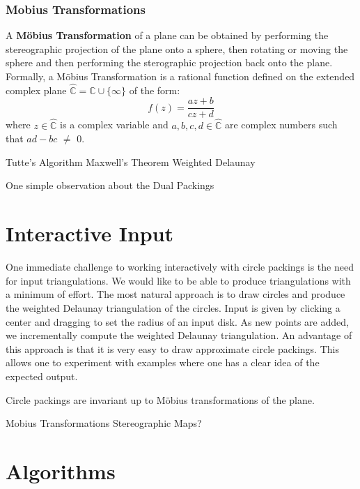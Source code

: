 \documentclass[a4paper,UKenglish]{lipics}
\newcommand{\C}{\mathbb{C}}
\newcommand{\CP}{\hat{\mathbb{C}}}
\begin{document}
  \subsubsection{Mobius Transformations}
  A \textbf{M\"{o}bius Transformation} of a plane can be obtained by performing the stereographic projection of the plane onto a sphere, then rotating or moving the sphere and then performing the sterographic projection back onto the plane. 
  Formally, a M\"{o}bius Transformation is a rational function defined on the extended complex plane $\CP = \C\cup\{\infty\}$ of the form:
  \begin{equation} 
  	f(z) = \frac{az+b}{cz+d}
  \end{equation}
  where $z\in\CP$ is a complex variable and $a,b,c,d\in\CP$ are complex numbers such that $ad - bc$ $\neq$ $0$.
  
  
  Tutte's Algorithm
  Maxwell's Theorem
  Weighted Delaunay

  One simple observation about the
  Dual Packings


\section{Interactive Input} %
\label{sec:interactive_input}

  One immediate challenge to working interactively with circle packings is the need for input triangulations.
  We would like to be able to produce triangulations with a minimum of effort.  
  The most natural approach is to draw circles and produce the weighted Delaunay triangulation of the circles.
  Input is given by clicking a center and dragging to set the radius of an input disk.
  As new points are added, we incrementally compute the weighted Delaunay triangulation.
  An advantage of this approach is that it is very easy to draw approximate circle packings.  
  This allows one to experiment with examples where one has a clear idea of the expected output.

  Circle packings are invariant up to M\"{o}bius transformations of the plane.

  
  Mobius Transformations
  Stereographic Maps?
  

\section{Algorithms} %
\label{sec:algorithms}
\end{document}
